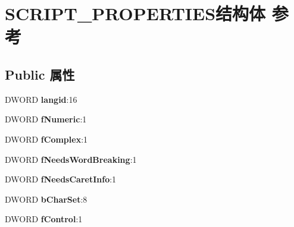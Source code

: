 \hypertarget{struct_s_c_r_i_p_t___p_r_o_p_e_r_t_i_e_s}{}\section{S\+C\+R\+I\+P\+T\+\_\+\+P\+R\+O\+P\+E\+R\+T\+I\+E\+S结构体 参考}
\label{struct_s_c_r_i_p_t___p_r_o_p_e_r_t_i_e_s}
\subsection*{Public 属性}
\begin{DoxyCompactItemize}
\item 
\mbox{\label{struct_s_c_r_i_p_t___p_r_o_p_e_r_t_i_e_s_acfdae3df06ab25f464489cec21ffbefc}} 
D\+W\+O\+RD {\bfseries langid}\+:16
\item 
\mbox{\label{struct_s_c_r_i_p_t___p_r_o_p_e_r_t_i_e_s_a6d673651d9850ca3fe2379282b1525e1}} 
D\+W\+O\+RD {\bfseries f\+Numeric}\+:1
\item 
\mbox{\label{struct_s_c_r_i_p_t___p_r_o_p_e_r_t_i_e_s_a26716824d4bd11c544d72feae3229e4d}} 
D\+W\+O\+RD {\bfseries f\+Complex}\+:1
\item 
\mbox{\label{struct_s_c_r_i_p_t___p_r_o_p_e_r_t_i_e_s_adeeaf7f08d1bf4b615c17d8b5b182995}} 
D\+W\+O\+RD {\bfseries f\+Needs\+Word\+Breaking}\+:1
\item 
\mbox{\label{struct_s_c_r_i_p_t___p_r_o_p_e_r_t_i_e_s_abf150e626ef29df89d64ca8151eaa16b}} 
D\+W\+O\+RD {\bfseries f\+Needs\+Caret\+Info}\+:1
\item 
\mbox{\label{struct_s_c_r_i_p_t___p_r_o_p_e_r_t_i_e_s_ad033bdd4fb1b15b5dd5f5f737e80c43d}} 
D\+W\+O\+RD {\bfseries b\+Char\+Set}\+:8
\item 
\mbox{\label{struct_s_c_r_i_p_t___p_r_o_p_e_r_t_i_e_s_a928af017ccd99dc235dab02d9ec44c21}} 
D\+W\+O\+RD {\bfseries f\+Control}\+:1
\item 

\end{DoxyCompactItemize}
